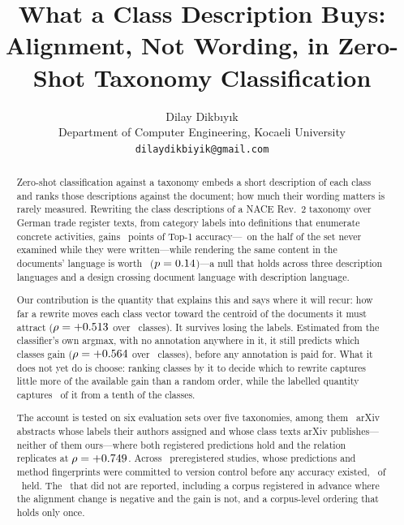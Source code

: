 \documentclass[11pt]{article}
\title{What a Class Description Buys:\\
       Alignment, Not Wording, in Zero-Shot Taxonomy Classification}
\author{Dilay Dikb\i y\i k \\
  Department of Computer Engineering, Kocaeli University \\
  \texttt{dilaydikbiyik@gmail.com} \\}
\begin{document}
\maketitle

\begin{abstract}
Zero-shot classification against a taxonomy embeds a short description of each
class and ranks those descriptions against the document; how much their wording
matters is rarely measured. Rewriting the class descriptions of a NACE Rev.~2
taxonomy over German trade register texts, from category labels into definitions
that enumerate concrete activities, gains \ContentEffect~points of Top-1
accuracy---\HeldOutContentEffect\ on the half of the set never examined while
they were written---while rendering the same content in the documents' language is
worth \LanguageEffect\ ($p = 0.14$)---a null that holds across three
description languages and a design crossing document language with description
language.

Our contribution is the quantity that explains this and says where it will
recur: how far a rewrite moves each class vector toward the centroid of the
documents it must attract ($\rho = +0.513$ over \NCLASSES\ classes). It
survives losing the labels. Estimated from the classifier's own argmax, with no
annotation anywhere in it, it still predicts which classes gain
($\rho = +0.564$ over \EstimateClasses\ classes), before any annotation
is paid for. What it does not yet do is choose: ranking classes by it to decide
which to rewrite captures little more of the available gain than a random
order, while the labelled quantity captures \LabelledTenth\ of it from a tenth
of the classes.

The account is tested on six evaluation sets over five taxonomies, among them
\ArxivN\ arXiv abstracts whose labels their authors assigned and whose class
texts arXiv publishes---neither of them ours---where both registered predictions
hold and the relation replicates at $\rho = +0.749$. Across
\RegisteredStudies\ preregistered studies, whose predictions and method
fingerprints were committed to version control before any accuracy existed,
\RegisteredHeld\ of \RegisteredPredictions\ held. The \RegisteredFailed\ that
did not are reported, including a corpus registered in advance where the
alignment change is negative and the gain is not, and a corpus-level ordering
that holds only once.
\end{abstract}
\end{document}
